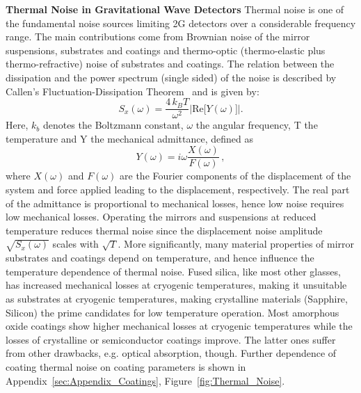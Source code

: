 \begin{Infobox}{\bf Thermal Noise in Gravitational Wave Detectors}
Thermal noise is one of the fundamental noise sources limiting 2G detectors over a considerable frequency range. The main contributions come from Brownian noise of the mirror suspensions, substrates and coatings and thermo-optic (thermo-elastic plus thermo-refractive) noise of substrates and coatings. The relation between the dissipation and the power spectrum (single sided) of the noise is described by Callen's Fluctuation-Dissipation Theorem~\cite{CaWe1951, Kubo:FDT, Callen:1959} and is given by:
\begin{equation}
S_x(\omega) = \frac{4\,k_B T}{\omega^2} \left| \mathrm{Re} \big[ Y(\omega) \big]\right| .
\end{equation}
\label{eq:FDT}
Here, $k_b$ denotes the Boltzmann constant, $\omega$ the angular frequency, T the temperature and Y the mechanical admittance, defined as
\begin{equation}
Y(\omega) = i \omega\frac{X(\omega)}{F(\omega)} \, ,
\end{equation}
where $X(\omega)$ and $F(\omega)$ are the Fourier components of the displacement of the system and force applied leading to the displacement, respectively. The real part of the admittance is proportional to mechanical losses, hence low noise requires low mechanical losses.
Operating the mirrors and suspensions at reduced temperature reduces thermal noise since the displacement noise amplitude 
$\sqrt{S_x(\omega)}$ scales with $\sqrt{T}$. 
More significantly, many material properties of mirror substrates and coatings depend on temperature, and hence influence the temperature dependence of thermal noise.
Fused silica, like most other glasses, has increased mechanical losses at cryogenic temperatures, making it unsuitable as substrates at cryogenic temperatures, making crystalline materials (Sapphire, Silicon) the prime candidates for low temperature operation.
Most amorphous oxide coatings show higher mechanical losses at cryogenic temperatures while the losses of crystalline or semiconductor coatings improve. The latter ones suffer from other drawbacks, e.g. optical absorption, though.
Further dependence of coating thermal noise on coating parameters is shown in Appendix~\ref{sec:Appendix_Coatings}, Figure~\ref{fig:Thermal_Noise}.
\label{Box:Thermal}
\end{Infobox}

